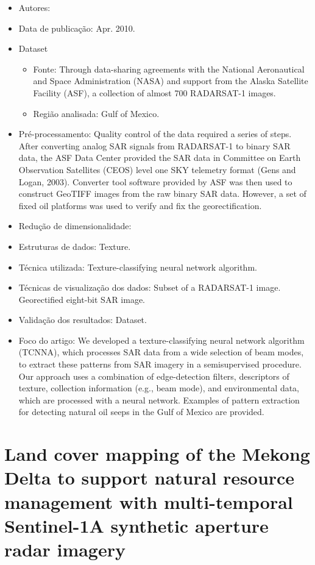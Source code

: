 \documentclass[paper=a4, fontsize=11pt]{scrartcl}
\begin{document}
\begin{itemize}
    \item Autores:~\cite{garcia2009using}
    \item Data de publicação: Apr. 2010.
    \item Dataset
    \begin{itemize}
        \item Fonte: Through data-sharing agreements with the National Aeronautical and Space Administration (NASA) and support from the Alaska Satellite Facility (ASF), a collection of almost 700 RADARSAT-1 images.
        \item Região analisada: Gulf of Mexico.
    \end{itemize}
    \item Pré-processamento: Quality control of the data required a series of steps. 
    After converting analog SAR signals from RADARSAT-1 to binary SAR data, the ASF Data Center provided the SAR data in Committee on Earth Observation Satellites (CEOS) level one SKY telemetry format (Gens and Logan, 2003). 
    Converter tool software provided by ASF was then used to construct GeoTIFF images from the raw binary SAR data. 
    However, a set of fixed oil platforms was used to verify and fix the georectification.
    \item Redução de dimensionalidade:
    \item Estruturas de dados: Texture.
    \item Técnica utilizada: Texture-classifying neural network algorithm.
    \item Técnicas de visualização dos dados: Subset of a RADARSAT-1 image. Georectified eight-bit SAR image.
    \item Validação dos resultados: Dataset.
    \item Foco do artigo: We developed a texture-classifying neural network algorithm (TCNNA), which processes SAR data from a wide selection of beam modes, to extract these patterns from SAR imagery in a semisupervised procedure. Our approach uses a combination of edge-detection filters, descriptors of texture, collection information (e.g., beam mode), and environmental data, which are processed with a neural network. Examples of pattern extraction for detecting natural oil seeps in the Gulf of Mexico are provided.
\end{itemize}

\newpage

\section*{\textcolor{VioletRed4}{Land cover mapping of the Mekong Delta to support natural resource management with multi-temporal Sentinel-1A synthetic aperture radar imagery}}
\end{document}
